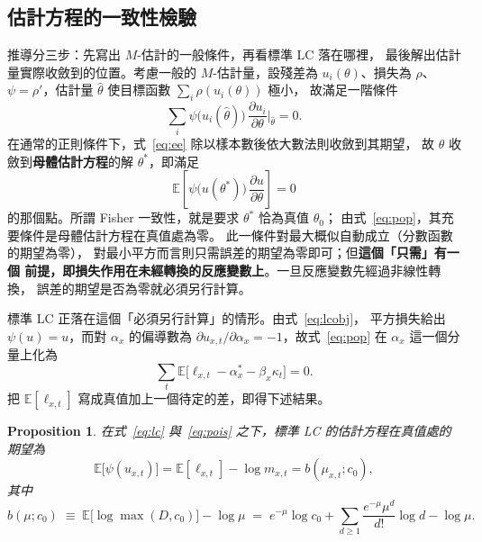 \documentclass[UTF8, fontset=macnew, a4paper, 12pt]{ctexart}
\newtheorem{prop}{Proposition}
\newcommand{\Ex}{\mathbb{E}}
\begin{document}
\subsection{估計方程的一致性檢驗}

推導分三步：先寫出 $M$-估計的一般條件，再看標準 LC 落在哪裡，
最後解出估計量實際收斂到的位置。考慮一般的 $M$-估計量，設殘差為 $u_i(\theta)$、損失為 $\rho$、
$\psi=\rho'$，估計量 $\hat\theta$ 使目標函數 $\sum_i\rho(u_i(\theta))$ 極小，
故滿足一階條件
\begin{equation}\label{eq:ee}
\sum_i \psi\big(u_i(\hat\theta)\big)\,
\frac{\partial u_i}{\partial\theta}\Big|_{\hat\theta}=0 .
\end{equation}
在通常的正則條件下，式~\eqref{eq:ee} 除以樣本數後依大數法則收斂到其期望，
故 $\hat\theta$ 收斂到\textbf{母體估計方程}的解 $\theta^{\ast}$，即滿足
\begin{equation}\label{eq:pop}
\Ex\!\left[\psi\big(u(\theta^{\ast})\big)\,
\frac{\partial u}{\partial\theta}\right]=0
\end{equation}
的那個點。所謂 Fisher 一致性，就是要求 $\theta^{\ast}$ 恰為真值 $\theta_0$；
由式~\eqref{eq:pop}，其充要條件是母體估計方程在真值處為零。
此一條件對最大概似自動成立（分數函數的期望為零），
對最小平方而言則只需誤差的期望為零即可；但\textbf{這個「只需」有一個
前提，即損失作用在未經轉換的反應變數上}。一旦反應變數先經過非線性轉換，
誤差的期望是否為零就必須另行計算。

標準 LC 正落在這個「必須另行計算」的情形。由式~\eqref{eq:lcobj}，
平方損失給出 $\psi(u)=u$，而對 $\alpha_x$ 的偏導數為
$\partial u_{x,t}/\partial\alpha_x=-1$，故式~\eqref{eq:pop} 在 $\alpha_x$
這一個分量上化為
\begin{equation}\label{eq:popalpha}
\sum_{t}\Ex\big[\ell_{x,t}-\alpha_x^{\ast}-\beta_x\kappa_t\big]=0 .
\end{equation}
把 $\Ex[\ell_{x,t}]$ 寫成真值加上一個待定的差，即得下述結果。

\begin{prop}\label{prop:fisher}
在式~\eqref{eq:lc} 與~\eqref{eq:pois} 之下，標準 LC 的估計方程在真值處的
期望為
\begin{equation}\label{eq:b}
\Ex\big[\psi(u_{x,t})\big]=\Ex[\ell_{x,t}]-\log m_{x,t}
= b(\mu_{x,t};c_0),
\end{equation}
其中
\begin{equation}\label{eq:bform}
b(\mu;c_0)\;\equiv\;\Ex\big[\log\max(D,c_0)\big]-\log\mu
\;=\;e^{-\mu}\log c_0+\sum_{d\ge1}\frac{e^{-\mu}\mu^{d}}{d!}\log d-\log\mu .
\end{equation}
\end{prop}
\end{document}
